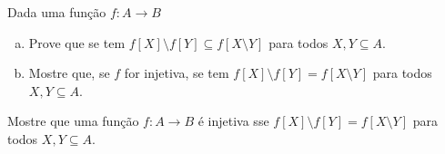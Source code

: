 \begin{exercise}
Dada uma função $f : A \to B$
\begin{enumerate}[(a)]
    \item Prove que se tem $f[X] \setminus f[Y] \subseteq f[X \setminus Y]$ para todos $X,Y \subseteq A$.
    \item Mostre que, se $f$ for injetiva, se tem $f[X] \setminus f[Y] = f[X \setminus Y]$ para todos $X,Y \subseteq A$.
\end{enumerate}
\end{exercise}

\begin{exercise}
Mostre que uma função $f : A \to B$ é injetiva sse $f[X] \setminus f[Y] = f[X \setminus Y]$ para todos $X,Y \subseteq A$.
\end{exercise}

